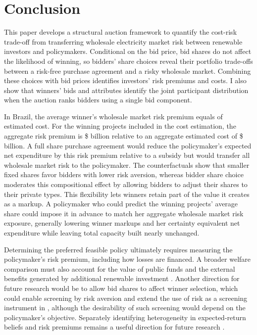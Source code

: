 \documentclass[12pt]{article}
\theoremstyle{definition} %
\begin{document}
\section{Conclusion}
\label{sec:conclusion}

This paper develops a structural auction framework to quantify the cost-risk trade-off from transferring wholesale electricity market risk between renewable investors and policymakers. Conditional on the bid price, bid shares do not affect the likelihood of winning, so bidders' share choices reveal their portfolio trade-offs between a risk-free purchase agreement and a risky wholesale market. Combining these choices with bid prices identifies investors' risk premiums and costs. I also show that winners' bids and attributes identify the joint participant distribution when the auction ranks bidders using a single bid component.

In Brazil, the average winner's wholesale market risk premium equals  of estimated cost. For the winning projects included in the cost estimation, the aggregate risk premium is \$ billion relative to an aggregate estimated cost of \$ billion. A full share purchase agreement would reduce the policymaker's expected net expenditure by this risk premium relative to a subsidy but would transfer all wholesale market risk to the policymaker. The counterfactuals show that smaller fixed shares favor bidders with lower risk aversion, whereas bidder share choice moderates this compositional effect by allowing bidders to adjust their shares to their private types. This flexibility lets winners retain part of the value it creates as a markup. A policymaker who could predict the winning projects' average share could impose it in advance to match her aggregate wholesale market risk exposure, generally lowering winner markups and her certainty equivalent net expenditure while leaving total capacity built nearly unchanged.

Determining the preferred feasible policy ultimately requires measuring the policymaker's risk premium, including how losses are financed. A broader welfare comparison must also account for the value of public funds and the external benefits generated by additional renewable investment \citep{Hahn2026}. Another direction for future research would be to allow bid shares to affect winner selection, which could enable screening by risk aversion and extend the use of risk as a screening instrument in \citet{Maskin1984}, although the desirability of such screening would depend on the policymaker's objective. Separately identifying heterogeneity in expected-return beliefs and risk premiums remains a useful direction for future research \citep*{Egan2026}.
\end{document}
